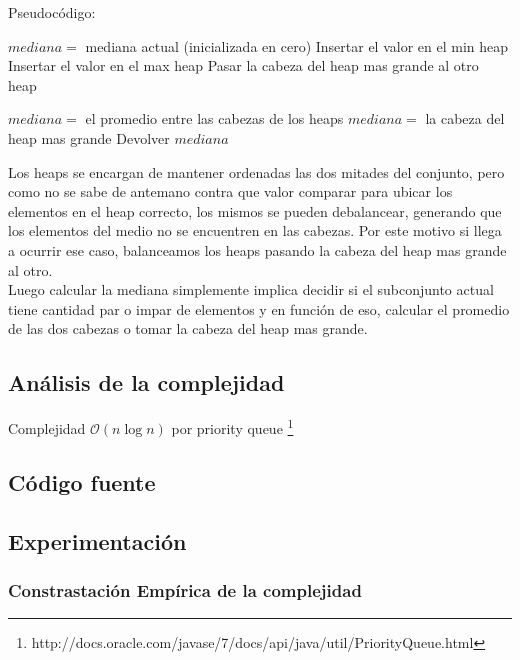 Pseudocódigo:
\begin{algorithmic}
	\STATE $mediana =$ mediana actual (inicializada en cero)
			\STATE Insertar el valor en el min heap
		\ELSE
			\STATE Insertar el valor en el max heap
		\ENDIF
			\STATE Pasar la cabeza del heap mas grande al otro heap
		\ENDIF

			\STATE $mediana = $ el promedio entre las cabezas de los heaps
		\ELSE
			\STATE $mediana = $ la cabeza del heap mas grande
		\ENDIF
		\STATE Devolver $mediana$
	\ENDFOR
\end{algorithmic}


Los heaps se encargan de mantener ordenadas las dos mitades del conjunto, pero como no se sabe de antemano contra que valor comparar para ubicar los elementos en el heap correcto, los mismos se pueden debalancear, generando que los elementos del medio no se encuentren en las cabezas. Por este motivo si llega a ocurrir ese caso, balanceamos los heaps pasando la cabeza del heap mas grande al otro.\\

Luego calcular la mediana simplemente implica decidir si el subconjunto actual tiene cantidad par o impar de elementos y en función de eso, calcular el promedio de las dos cabezas o tomar la cabeza del heap mas grande.
\subsection{Análisis de la complejidad}
Complejidad $\mathcal{O}(n\log{}n)$ por priority queue \footnote{http://docs.oracle.com/javase/7/docs/api/java/util/PriorityQueue.html}
\subsection{Código fuente}





\subsection{Experimentación}

\subsubsection{Constrastación Empírica de la complejidad}

